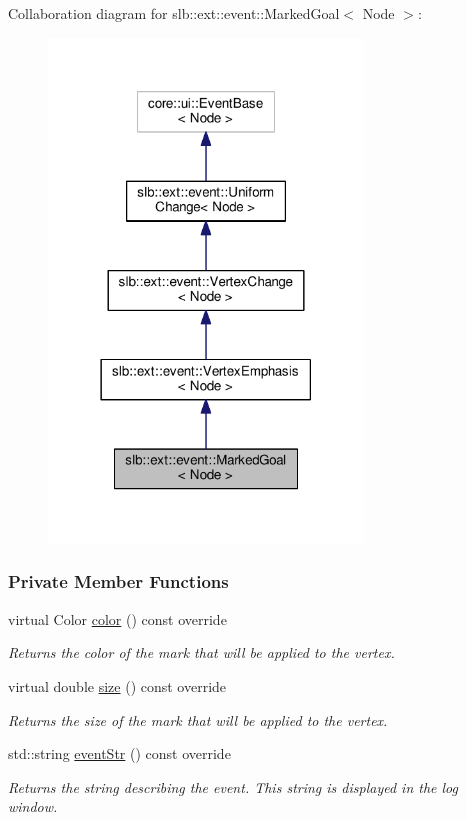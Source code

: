 Collaboration diagram for slb\+:\+:ext\+:\+:event\+:\+:Marked\+Goal$<$ Node $>$\+:\nopagebreak
\begin{figure}[H]
\begin{center}
\leavevmode
\includegraphics[width=237pt]{structslb_1_1ext_1_1event_1_1MarkedGoal__coll__graph}
\end{center}
\end{figure}
\subsubsection*{Private Member Functions}
\begin{DoxyCompactItemize}
\item 
virtual Color \hyperlink{structslb_1_1ext_1_1event_1_1MarkedGoal_ae47b93b1f04e8feef1a2aa06ade7d3ce}{color} () const override
\begin{DoxyCompactList}\small\item\em Returns the color of the mark that will be applied to the vertex. \end{DoxyCompactList}\item 
virtual double \hyperlink{structslb_1_1ext_1_1event_1_1MarkedGoal_ab8d81d9bb2c8b4fac9c45a3420ced27e}{size} () const override
\begin{DoxyCompactList}\small\item\em Returns the size of the mark that will be applied to the vertex. \end{DoxyCompactList}\item 
std\+::string \hyperlink{structslb_1_1ext_1_1event_1_1MarkedGoal_ab8ea8f823f7f6684a09e65dcbffe226f}{event\+Str} () const override
\begin{DoxyCompactList}\small\item\em Returns the string describing the event. This string is displayed in the log window. \end{DoxyCompactList}\end{DoxyCompactItemize}
